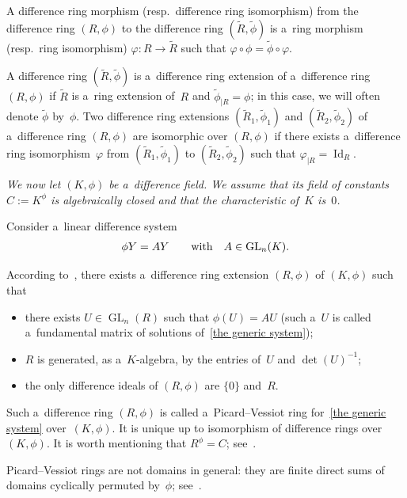 \documentclass[pdftex]{sigma}
\numberwithin{equation}{section}
\begin{document}
A dif\/ference ring morphism (resp.\
dif\/ference ring isomorphism) from the dif\/ference ring $(R,\phi)$ to the dif\/ference ring
$(\widetilde{R},\widetilde{\phi})$ is a~ring morphism (resp.\
ring isomorphism) $\varphi: R \rightarrow \widetilde{R}$ such that $\varphi \circ \phi = \widetilde{\phi} \circ
\varphi$.

A dif\/ference ring $(\widetilde{R},\widetilde{\phi})$ is a~dif\/ference ring extension of a~dif\/ference ring $(R,\phi)$ if
$\widetilde{R}$ is a~ring extension of~$R$ and $\widetilde{\phi}_{\vert R}=\phi$; in this case, we will often denote
$\widetilde{\phi}$ by~$\phi$.
Two dif\/ference ring extensions $(\widetilde{R}_{1},\widetilde{\phi}_{1})$ and $(\widetilde{R}_{2},\widetilde{\phi}_{2})$
of a~dif\/ference ring $(R,\phi)$ are isomorphic over $(R,\phi)$ if there exists a~dif\/ference ring isomorphism~$\varphi$
from $(\widetilde{R}_{1},\widetilde{\phi}_{1})$ to $(\widetilde{R}_{2},\widetilde{\phi}_{2})$ such that $\varphi_{\vert
R}=\operatorname{Id}_{R}$.

{\it We now let $(K,\phi)$ be a~difference field.
We assume that its field of constants $C:=K^{\phi}$ is algebraically closed and that the characteristic of~$K$ is~$0$.}

Consider a~linear dif\/ference system
\begin{gather}
\label{the generic system}
\phi Y=AY \qquad \hbox{with} \quad A \in \operatorname{GL}_{n}(K).
\end{gather}

According to~\cite[Section~1.1]{VdPS97}, there exists a~dif\/ference ring extension $(R,\phi)$ of $(K,\phi)$ such that
\begin{itemize}\itemsep=0pt
\item[1)] there exists $U \in \operatorname{GL}_{n}(R)$ such that $\phi (U) = AU$ (such a~$U$ is called a~fundamental
matrix of solutions of~\eqref{the generic system});
\item[2)] $R$ is generated, as a~$K$-algebra, by the entries of~$U$ and $\det(U)^{-1}$;
\item[3)] the only dif\/ference ideals of $(R,\phi)$ are $\{0\}$ and~$R$.
\end{itemize}
Such a~dif\/ference ring $(R,\phi)$ is called a~Picard--Vessiot ring for~\eqref{the generic system} over~$(K,\phi)$.
It is unique up to isomorphism of dif\/ference rings over $(K,\phi)$.
It is worth mentioning that $R^{\phi}=C$; see~\cite[Lemma~1.8]{VdPS97}.
\begin{Remark}
Picard--Vessiot rings are not domains in general: they are f\/inite direct sums of domains cyclically permuted by~$\phi$;
see~\cite[Corollary~1.16]{VdPS97}.
\end{Remark}
\end{document}
